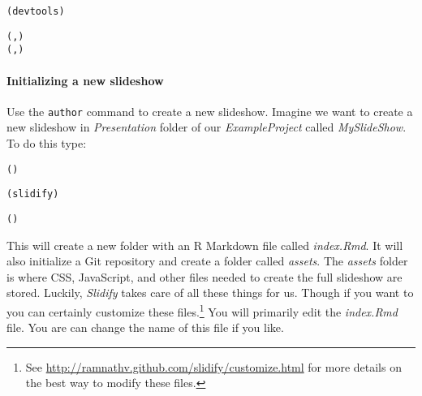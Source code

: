 \begin{knitrout}
\color{fgcolor}\begin{kframe}
\begin{alltt}
(devtools)

(, )
(, )
\end{alltt}
\end{kframe}
\end{knitrout}


\paragraph{Initializing a new slideshow}

Use the \verb|author| command to create a new slideshow. Imagine we want to create a new slideshow in \emph{Presentation} folder of our \emph{ExampleProject} called \emph{MySlideShow}. To do this type:

\begin{knitrout}
\color{fgcolor}\begin{kframe}
\begin{alltt}
()

(slidify)

()
\end{alltt}
\end{kframe}
\end{knitrout}


This will create a new folder with an R Markdown file called \emph{index.Rmd}. It will also initialize a Git repository and create a folder called \emph{assets}. The \emph{assets} folder is where CSS, JavaScript, and other files needed to create the full slideshow are stored. Luckily, \emph{Slidify} takes care of all these things for us. Though if you want to you can certainly customize these files.\footnote{See \url{http://ramnathv.github.com/slidify/customize.html} for more details on the best way to modify these files.} You will primarily edit the \emph{index.Rmd} file. You are can change the name of this file if you like. 

